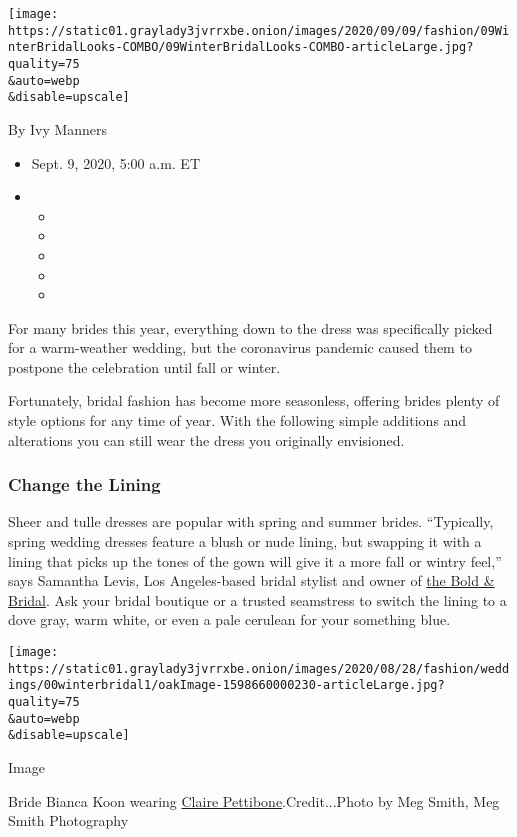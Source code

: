 \texttt{[image: https://static01.graylady3jvrrxbe.onion/images/2020/09/09/fashion/09WinterBridalLooks-COMBO/09WinterBridalLooks-COMBO-articleLarge.jpg?quality=75\\\&auto=webp\\\&disable=upscale]}

By Ivy Manners

\begin{itemize}
\item
  Sept. 9, 2020, 5:00 a.m. ET
\item
  \begin{itemize}
  \item
  \item
  \item
  \item
  \item
  \end{itemize}
\end{itemize}

For many brides this year, everything down to the dress was specifically
picked for a warm-weather wedding, but the coronavirus pandemic caused
them to postpone the celebration until fall or winter.

Fortunately, bridal fashion has become more seasonless, offering brides
plenty of style options for any time of year. With the following simple
additions and alterations you can still wear the dress you originally
envisioned.

\hypertarget{change-the-lining}{%
\subsubsection{Change the Lining}\label{change-the-lining}}

Sheer and tulle dresses are popular with spring and summer brides.
``Typically, spring wedding dresses feature a blush or nude lining, but
swapping it with a lining that picks up the tones of the gown will give
it a more fall or wintry feel,'' says Samantha Levis, Los Angeles-based
bridal stylist and owner of \href{https://www.theboldandbridal.com/}{the
Bold \& Bridal}. Ask your bridal boutique or a trusted seamstress to
switch the lining to a dove gray, warm white, or even a pale cerulean
for your something blue.

\texttt{[image: https://static01.graylady3jvrrxbe.onion/images/2020/08/28/fashion/weddings/00winterbridal1/oakImage-1598660000230-articleLarge.jpg?quality=75\\\&auto=webp\\\&disable=upscale]}

Image

Bride Bianca Koon wearing \href{https://clairepettibone.com/}{Claire
Pettibone}.Credit...Photo by Meg Smith, Meg Smith Photography

